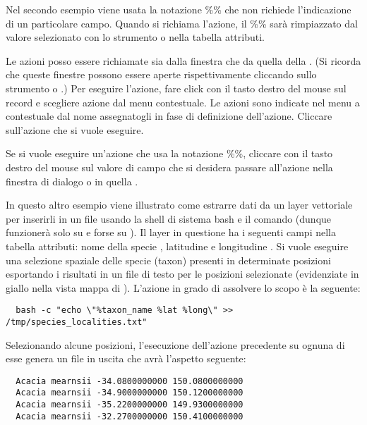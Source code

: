 Nel secondo esempio viene usata la notazione \%\% che non richiede
l'indicazione di un particolare campo. Quando si richiama l'azione, il \%\%
sarà rimpiazzato dal valore selezionato con lo strumento  
o nella tabella attributi.

\label{label_usingactions}

Le azioni posso essere richiamate sia dalla finestra  
che da quella della . 
(Si ricorda che queste finestre possono essere aperte rispettivamente cliccando sullo
strumento  o
.)
Per eseguire l'azione, fare click con il tasto destro del mouse sul record e scegliere
azione dal menu contestuale. Le azioni sono indicate nel menu a contestuale dal
nome assegnatogli in fase di definizione dell'azione. Cliccare sull'azione che
si vuole eseguire.

Se si vuole eseguire un'azione che usa la notazione \%\%, cliccare con il tasto destro del mouse
sul valore di campo che si desidera passare all'azione nella finestra di dialogo  
o in quella .

In questo altro esempio viene illustrato come estrarre dati da un layer
vettoriale per inserirli in un file usando la shell di sistema bash e il
comando  (dunque funzionerà solo su \nix e forse su \osx). Il
layer in questione ha i seguenti campi nella tabella attributi: nome della
specie , latitudine  e longitudine
. Si vuole eseguire una selezione spaziale delle specie
(taxon) presenti in determinate posizioni esportando i risultati in un file di
testo per le posizioni selezionate (evidenziate in giallo nella
vista mappa di \qg). L'azione in grado di assolvere lo scopo è la seguente:

\begin{verbatim}
  bash -c "echo \"%taxon_name %lat %long\" >> /tmp/species_localities.txt"
\end{verbatim} 

Selezionando alcune posizioni, l'esecuzione dell'azione precedente su ognuna
di esse genera un file in uscita che avrà l'aspetto seguente:

\begin{verbatim}
  Acacia mearnsii -34.0800000000 150.0800000000
  Acacia mearnsii -34.9000000000 150.1200000000
  Acacia mearnsii -35.2200000000 149.9300000000
  Acacia mearnsii -32.2700000000 150.4100000000
\end{verbatim} 

